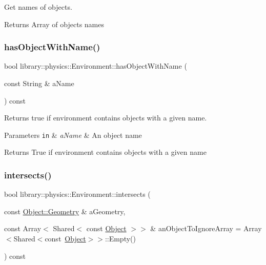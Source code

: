 Get names of objects. 

\begin{DoxyReturn}{Returns}
Array of objects names 
\end{DoxyReturn}
\mbox{\label{classlibrary_1_1physics_1_1_environment_ab88060948d60e3775d3c48047e1565aa}} 
\subsubsection{\texorpdfstring{has\+Object\+With\+Name()}{hasObjectWithName()}}
{\footnotesize\ttfamily bool library\+::physics\+::\+Environment\+::has\+Object\+With\+Name (\begin{DoxyParamCaption}\item[{const String \&}]{a\+Name }\end{DoxyParamCaption}) const}



Returns true if environment contains objects with a given name. 


\begin{DoxyParams}[1]{Parameters}
\mbox{\tt in}  & {\em a\+Name} & An object name \\
\hline
\end{DoxyParams}
\begin{DoxyReturn}{Returns}
True if environment contains objects with a given name 
\end{DoxyReturn}
\mbox{\label{classlibrary_1_1physics_1_1_environment_ad3dec84407f2d3d91efc833a563f11c9}} 
\subsubsection{\texorpdfstring{intersects()}{intersects()}}
{\footnotesize\ttfamily bool library\+::physics\+::\+Environment\+::intersects (\begin{DoxyParamCaption}\item[{const \hyperlink{classlibrary_1_1physics_1_1env_1_1_object_abdf50733c7ad97327fb64edca5670f13}{Object\+::\+Geometry} \&}]{a\+Geometry,  }\item[{const Array$<$ Shared$<$ const \hyperlink{classlibrary_1_1physics_1_1env_1_1_object}{Object} $>$$>$ \&}]{an\+Object\+To\+Ignore\+Array = {\ttfamily Array$<$Shared$<$const~\hyperlink{classlibrary_1_1physics_1_1env_1_1_object}{Object}$>$$>$\+:\+:Empty()} }\end{DoxyParamCaption}) const}



